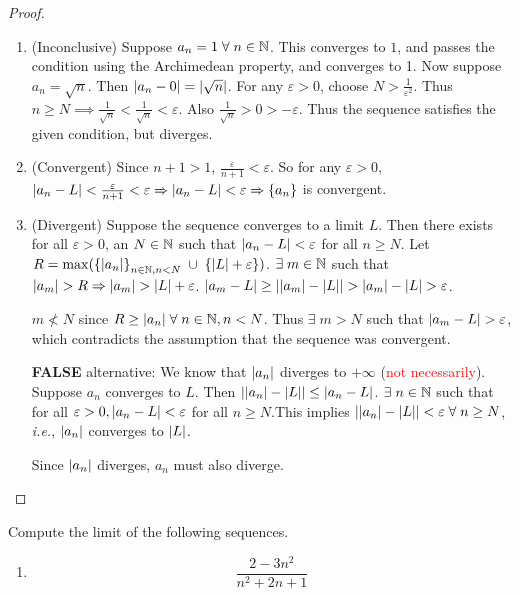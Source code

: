 \documentclass[12pt]{article}
\begin{document}
\begin{proof}
    \begin{enumerate}[label=(\arabic*)]
        \item (Inconclusive) Suppose $a_{n} = 1 \;\forall\; n \in \mathbb{N}$.
        This converges to $1$, and passes the condition using the Archimedean property, and converges to 1.
        Now suppose $a_{n} = \sqrt{n}$.
        Then $\abs{a_{n} - 0} = \abs{\sqrt{n}}$.
        For any $\varepsilon > 0$, choose $N > \frac{1}{\varepsilon^{2}}$.
        Thus $n \geq N \implies \frac{1}{\sqrt{n}} < \frac{1}{\sqrt{n}} < \varepsilon$.
        Also $\frac{1}{\sqrt{n}} > 0 > -\varepsilon$.
        Thus the sequence satisfies the given condition, but diverges.
        \item (Convergent) Since $n + 1 > 1$, $\frac{\varepsilon}{n + 1} < \varepsilon$.
        So for any $\varepsilon > 0$, $\abs{a_{n} - L} < \frac{\varepsilon}{n + 1} < \varepsilon \implies \abs{a_{n} - L} < \varepsilon \implies \set{a_{n}}$ is convergent.
        \item (Divergent) Suppose the sequence converges to a limit $L$.
        Then there exists for all $\varepsilon > 0$, an $N \in \mathbb{N}$ such that $\abs{a_{n} - L} < \varepsilon$ for all $n \geq  N$.
        Let $R = \max(\set{\abs{a_{n}}}_{n \in \N, n < N} \;\cup\; \set{\abs{L} + \varepsilon})$.
        $\exists\; m \in \mathbb{N}$ such that $\abs{a_{m}} > R \implies \abs{a_{m}} > \abs{L} + \varepsilon$.
        $\abs{a_{m} - L} \geq \abs{\abs{a_{m}} - \abs{L}} > \abs{a_{m}} - \abs{L} > \varepsilon$.
        
        $m \not< N$ since $R \geq \abs{a_{n}} \;\forall\; n \in \N, n < N$.
        Thus $\exists\; m > N$ such that $\abs{a_{m} - L} > \varepsilon$, which contradicts the assumption that the sequence was convergent.

        \textbf{FALSE} alternative: We know that $\abs{a_{n}}$ diverges to $+\infty$ (\textcolor{red}{not necessarily}).
        Suppose $a_{n}$ converges to $L$.
        Then $\abs{\abs{a_{n}} - \abs{L}} \leq \abs{a_{n} - L}$.
        $\exists\; n \in \mathbb{N}$ such that for all $\varepsilon > 0, \abs{a_{n} - L} < \varepsilon$ for all $n \geq N$.This implies $\abs{\abs{a_{n}} - \abs{L}} < \varepsilon \;\forall\; n \geq N$, \textit{i.e.}, $\abs{a_{n}}$ converges to $\abs{L}$.

        Since $\abs{a_{n}}$ diverges, $a_{n}$ must also diverge. \qedhere
    \end{enumerate}
\end{proof}

\begin{problem}
    Compute the limit of the following sequences.
    \begin{enumerate}[label=(\arabic*)]
        \item \[
            \frac{2-3n^{2}}{n^{2} + 2n + 1}
        \]
    \end{enumerate}
\end{problem}
\end{document}
